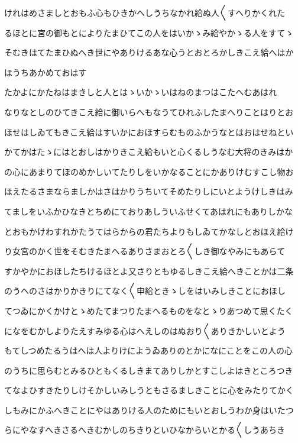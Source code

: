 \documentclass[a4paper,11pt,landscape]{ltjtarticle}
\begin{document}
\par\medskip
けれはめさましとおもふ心もひきかへしうちなかれ給ぬ人〱すへりかくれた
\par\medskip
るほとに宮の御もとによりたまひてこの人をはいかゝみ給やかゝる人をすてゝ
\par\medskip
そむきはてたまひぬへき世にやありけるあな心うとおとろかしきこえ給へはか
\par\medskip
ほうちあかめておはす
\par\medskip
たかよにかたねはまきしと人とはゝいかゝいはねのまつはこたへむあはれ
\par\medskip
なりなとしのひてきこえ給に御いらへもなうてひれふしたまへりことはりとお
\par\medskip
ほせはしゐてもきこえ給はすいかにおほすらむものふかうなとはおはせねとい
\par\medskip
かてかはたゝにはとおしはかりきこえ給もいと心くるしうなむ大将のきみはか
\par\medskip
の心にあまりてほのめかしいてたりしをいかなることにかありけむすこし物お
\par\medskip
ほえたるさまならましかはさはかりうちいてそめたりしにいとようけしきはみ
\par\medskip
てましをいふかひなきとちめにておりあしういふせくてあはれにもありしかな
\par\medskip
とおもかけわすれかたうてはらからの君たちよりもしゐてかなしとおほえ給け
\par\medskip
り女宮のかく世をそむきたまへるありさまおとろ〱しき御なやみにもあらて
\par\medskip
すかやかにおほしたちけるほとよ又さりともゆるしきこえ給へきことかは二条
\par\medskip
のうへのさはかりかきりにてなく〱申給ときゝしをはいみしきことにおほし
\par\medskip
てつゐにかくかけとゝめたてまつりたまへるものをなとゝりあつめて思くたく
\par\medskip
になをむかしよりたえすみゆる心はへえしのはぬおり〱ありきかしいとよう
\par\medskip
もてしつめたるうはへは人よりけにようゐありのとかになにことをこの人の心
\par\medskip
のうちに思らむとみるひともくるしきまてありしかとすこしよはきところつき
\par\medskip
てなよひすきたりしけそかしいみしうともさるましきことに心をみたりてかく
\par\medskip
しもみにかふへきことにやはありける人のためにもいとおしうわか身はいたつ
\par\medskip
らにやなすへきさるへきむかしのちきりといひなからいとかる〱しうあちき
\end{document}
